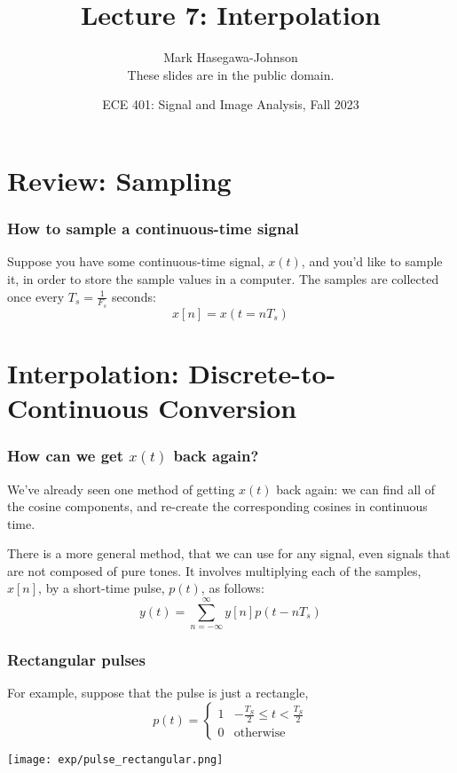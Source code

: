 \documentclass{beamer}
\title{Lecture 7: Interpolation}
\author{Mark Hasegawa-Johnson\\These slides are in the public domain.}
\date{ECE 401: Signal and Image Analysis, Fall 2023}
\begin{document}
\begin{frame}
  \maketitle
\end{frame}

\begin{frame}
  \tableofcontents
\end{frame}

\section[Sampling]{Review: Sampling}
\setcounter{subsection}{1}

\begin{frame}
  \frametitle{How to sample a continuous-time signal}

  Suppose you have some continuous-time signal, $x(t)$, and you'd like
  to sample it, in order to store the sample values in a computer.
  The samples are collected once every $T_s=\frac{1}{F_s}$ seconds:
  \begin{displaymath}
    x[n] = x(t=nT_s)
  \end{displaymath}
\end{frame}

\section[Interpolation]{Interpolation: Discrete-to-Continuous Conversion}
\setcounter{subsection}{1}

\begin{frame}
  \frametitle{How can we get $x(t)$ back again?}

  We've already seen one method of getting $x(t)$ back again: we can
  find all of the cosine components, and re-create the corresponding
  cosines in continuous time.

  There is a more general method, that we can use for any signal, even
  signals that are not composed of pure tones.  It involves
  multiplying each of the samples, $x[n]$, by a short-time pulse,
  $p(t)$, as follows:
  \begin{displaymath}
    y(t) = \sum_{n=-\infty}^\infty y[n]p(t-nT_s)
  \end{displaymath}
\end{frame}

\begin{frame}
  \frametitle{Rectangular pulses}

  For example, suppose that the pulse is  just a  rectangle,
  \begin{displaymath}
    p(t) = \begin{cases}
      1 & -\frac{T_S}{2}\le t<\frac{T_S}{2}\\
      0 & \mbox{otherwise}
    \end{cases}
  \end{displaymath}

  \centerline{\texttt{[image: exp/pulse\_rectangular.png]}}  
\end{frame}
\end{document}
